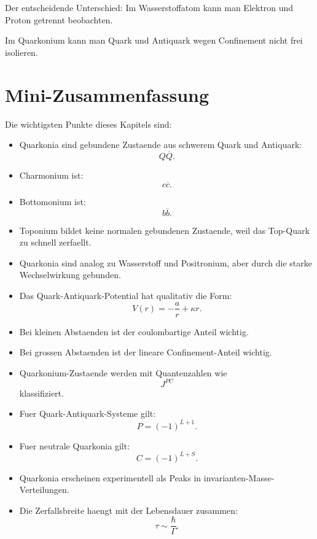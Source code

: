 \begin{examtipbox}
Der entscheidende Unterschied:
Im Wasserstoffatom kann man Elektron und Proton getrennt beobachten.

Im Quarkonium kann man Quark und Antiquark wegen Confinement nicht frei isolieren.
\end{examtipbox}

\section{Mini-Zusammenfassung}

\begin{notebox}
Die wichtigsten Punkte dieses Kapitels sind:
\begin{itemize}
    \item Quarkonia sind gebundene Zustaende aus schwerem Quark und Antiquark:
    \[
        Q\overline{Q}.
    \]
    \item Charmonium ist:
    \[
        c\overline{c}.
    \]
    \item Bottomonium ist:
    \[
        b\overline{b}.
    \]
    \item Toponium bildet keine normalen gebundenen Zustaende, weil das Top-Quark zu
    schnell zerfaellt.
    \item Quarkonia sind analog zu Wasserstoff und Positronium, aber durch die starke
    Wechselwirkung gebunden.
    \item Das Quark-Antiquark-Potential hat qualitativ die Form:
    \[
        V(r)=-\frac{a}{r}+\kappa r.
    \]
    \item Bei kleinen Abstaenden ist der coulombartige Anteil wichtig.
    \item Bei grossen Abstaenden ist der lineare Confinement-Anteil wichtig.
    \item Quarkonium-Zustaende werden mit Quantenzahlen wie
    \[
        J^{PC}
    \]
    klassifiziert.
    \item Fuer Quark-Antiquark-Systeme gilt:
    \[
        P=(-1)^{L+1}.
    \]
    \item Fuer neutrale Quarkonia gilt:
    \[
        C=(-1)^{L+S}.
    \]
    \item Quarkonia erscheinen experimentell als Peaks in invarianten-Masse-Verteilungen.
    \item Die Zerfallsbreite haengt mit der Lebensdauer zusammen:
    \[
        \tau \sim \frac{\hbar}{\Gamma}.
    \]
\end{itemize}
\end{notebox}

